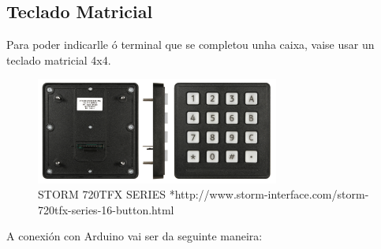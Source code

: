\documentclass[11pt,twoside]{book}
\begin{document}
\subsection{Teclado Matricial}

Para poder indicarlle ó terminal que se completou unha caixa, vaise usar un teclado matricial 4x4.

\begin{figure}[H]
	\begin{center}
		\includegraphics[width=8cm]{images/teclado_storm.jpg}
	\end{center}
	\caption{STORM 720TFX SERIES *http://www.storm-interface.com/storm-720tfx-series-16-button.html}
	\label{fig:TecladoStorm}
\end{figure}

A conexión con Arduino vai ser da seguinte maneira:
\end{document}
